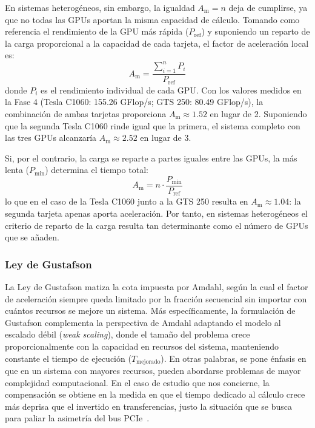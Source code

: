 \documentclass[a4paper,11pt]{article}
\begin{document}
En sistemas heterogéneos, sin embargo, la igualdad $A_{\text{m}} = n$ deja de cumplirse, ya que no todas las GPUs aportan
la misma capacidad de cálculo. Tomando como referencia el rendimiento de la GPU más rápida ($P_{\text{ref}}$) y suponiendo un
reparto de la carga proporcional a la capacidad de cada tarjeta, el factor de aceleración local es:
\begin{equation}\label{eq:am_proporcional}
    A_{\text{m}} = \frac{\sum_{i=1}^{n} P_i}{P_{\text{ref}}}
\end{equation}
donde $P_i$ es el rendimiento individual de cada GPU. Con los valores medidos en la Fase 4 (Tesla C1060: 155.26 GFlop/s;
GTS 250: 80.49 GFlop/s), la combinación de ambas tarjetas proporciona $A_{\text{m}} \approx 1.52$ en lugar de 2. Suponiendo
que la segunda Tesla C1060 rinde igual que la primera, el sistema completo con las tres GPUs alcanzaría
$A_{\text{m}} \approx 2.52$ en lugar de 3.

Si, por el contrario, la carga se reparte a partes iguales entre las GPUs, la más lenta ($P_{\min}$) determina el tiempo total:
\begin{equation}\label{eq:am_equitativo}
    A_{\text{m}} = n \cdot \frac{P_{\min}}{P_{\text{ref}}}
\end{equation}
lo que en el caso de la Tesla C1060 junto a la GTS 250 resulta en $A_{\text{m}} \approx 1.04$: la segunda tarjeta apenas aporta
aceleración. Por tanto, en sistemas heterogéneos el criterio de reparto de la carga resulta tan determinante como el número de
GPUs que se añaden.

\subsubsection*{Ley de Gustafson}

La Ley de Gustafson matiza la cota impuesta por Amdahl, según la cual el factor de aceleración siempre queda limitado por la fracción
secuencial sin importar con cuántos recursos se mejore un sistema. Más específicamente, la formulación de Gustafson complementa la perspectiva
de Amdahl adaptando el modelo al escalado débil (\textit{weak scaling}), donde el tamaño del problema crece proporcionalmente con la capacidad
en recursos del sistema, manteniendo constante el tiempo de
ejecución ($T_{\text{mejorado}}$).
En otras palabras, se pone énfasis en que en un sistema con mayores recursos, pueden abordarse problemas de mayor complejidad
computacional. En el caso de estudio que nos concierne, la compensación se obtiene en la medida en que el tiempo dedicado al cálculo crece más
deprisa que el invertido en transferencias, justo la situación que se busca para paliar la asimetría del bus PCIe~\cite{gustafson1988}.
\end{document}
